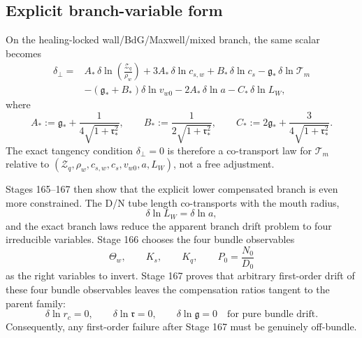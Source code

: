 \subsection{Explicit branch-variable form}
On the healing-locked wall/BdG/Maxwell/mixed branch, the same scalar becomes
\begin{equation}
\label{eq:app-part05-delta-perp-explicit}
\begin{aligned}
\delta_\perp={}&
A_*\,\delta\ln\!\left(\frac{\mathcal Z_q}{\rho_w}\right)
+3A_*\,\delta\ln c_{s,w}
+B_*\,\delta\ln c_s
-\mathfrak g_*\,\delta\ln\mathcal T_m \\
&-(\mathfrak g_*+B_*)\delta\ln v_{w0}
-2A_*\,\delta\ln a
-C_*\,\delta\ln L_W,
\end{aligned}
\end{equation}
where
\begin{equation}
\label{eq:app-part05-ABC-defs}
A_*:=\mathfrak g_*+\frac{1}{4\sqrt{1+\mathfrak r_*^2}},
\qquad
B_*:=\frac{1}{2\sqrt{1+\mathfrak r_*^2}},
\qquad
C_*:=2\mathfrak g_*+\frac{3}{4\sqrt{1+\mathfrak r_*^2}}.
\end{equation}
The exact tangency condition \(\delta_\perp=0\) is therefore a co-transport law for \(\mathcal T_m\) relative to
\(
(\mathcal Z_q,\allowbreak \rho_w,\allowbreak c_{s,w},\allowbreak c_s,\allowbreak v_{w0},\allowbreak a,\allowbreak L_W)
\),
not a free adjustment.

Stages 165--167 then show that the explicit lower compensated branch is even more constrained.  The D/N tube length co-transports with the mouth radius,
\begin{equation}
\label{eq:app-part05-LW-co-transport}
\delta\ln L_W=\delta\ln a,
\end{equation}
and the exact branch laws reduce the apparent branch drift problem to four irreducible variables.  Stage 166 chooses the four bundle observables
\begin{equation}
\label{eq:app-part05-bundle-observables}
\Theta_w,
\qquad
K_s,
\qquad
K_q,
\qquad
P_0=\frac{N_0}{D_0}
\end{equation}
as the right variables to invert.  Stage 167 proves that arbitrary first-order drift of these four bundle observables leaves the compensation ratios tangent to the parent family:
\begin{equation}
\label{eq:app-part05-tangent-parent-family}
\delta\ln r_c=0,
\qquad
\delta\ln\mathfrak r=0,
\qquad
\delta\ln\mathfrak g=0
\quad
\text{for pure bundle drift.}
\end{equation}
Consequently, any first-order failure after Stage 167 must be genuinely off-bundle.

